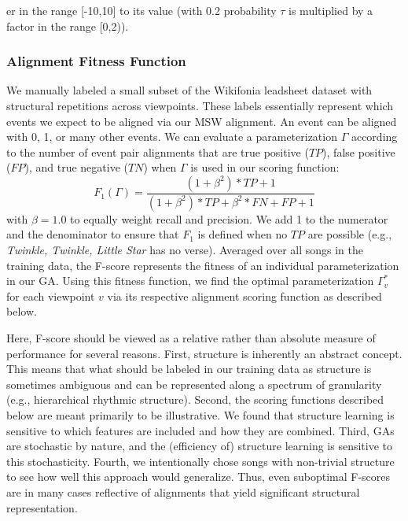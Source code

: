 \documentclass[phd,electronic,oneside,twosidetoc,letterpaper,chaptercenter,parttop,lof,lot]{byumsphd}
\begin{document}
er in the range [-10,10] to its value (with 0.2 probability $\tau$ is multiplied by a factor in the range [0,2)).

\subsubsection{Alignment Fitness Function}
We manually labeled a small subset of the Wikifonia leadsheet dataset with structural repetitions across viewpoints. These labels essentially represent which events we expect to be aligned via our MSW alignment. An event can be aligned with 0, 1, or many other events. We can evaluate a parameterization $\Gamma$ according to the number of event pair alignments that are true positive ($TP$), false positive ($FP$), and true negative ($TN$) when $\Gamma$ is used in our scoring function: %
\[ 
F_{1}(\Gamma)=\frac{(1+\beta^2) * TP + 1}{(1+\beta^2) * TP + \beta^2 * FN + FP + 1}
\]
\noindent with $\beta=1.0$ to equally weight recall and precision. We add 1 to the numerator and the denominator to ensure that $F_1$ is defined when no $TP$ are possible (e.g., \textit{Twinkle, Twinkle, Little Star} has no verse). Averaged over all songs in the training data, the F-score represents the fitness of an individual parameterization in our GA. Using this fitness function, we find the optimal parameterization $\Gamma^*_v$ for each viewpoint $v$ %
via its respective alignment scoring function as described below.

Here, F-score should be viewed as a relative rather than absolute measure of performance for several reasons. First, structure is inherently an abstract concept. This means that what should be labeled in our training data as structure is sometimes ambiguous and can be represented along a spectrum of granularity (e.g., hierarchical rhythmic structure). Second, the scoring functions described below are meant primarily to be illustrative. We found that structure learning is sensitive to which features are included and how they are combined. Third, GAs are stochastic by nature, and the (efficiency of) structure learning is sensitive to this stochasticity. %
Fourth, we intentionally chose songs with non-trivial structure to see how well this approach would generalize. Thus, even suboptimal F-scores are in many cases reflective of alignments that yield significant structural representation.
\end{document}
